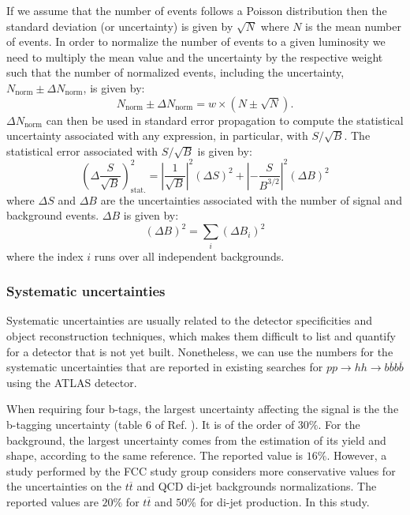 If we assume that the number of events follows a Poisson distribution then the standard deviation (or uncertainty) is given by $\sqrt{N}$ where $N$ is the mean number of events. In order to normalize the number of events to a given luminosity we need to multiply the mean value and the uncertainty by the respective weight such that the number of normalized events, including the uncertainty, $N_{\text{norm}}\pm \Delta N_{\text{norm}}$, is given by:
\begin{equation}
	N_{\text{norm}}\pm \Delta N_{\text{norm}}=w\times \left(N \pm \sqrt{N}\right).
\end{equation}
$\Delta N_{\text{norm}}$ can then be used in standard error propagation to compute the statistical uncertainty associated with any expression, in particular, with $S/\sqrt{B}$. The statistical error associated with $S/\sqrt{B}$ is given by:
\begin{equation}
	\left(\Delta\frac{S}{\sqrt{B}}\right)_{\text{stat.}}^2=\left|\frac{1}{\sqrt{B}}\right|^2 (\Delta S)^2+\left|-\frac{S}{B^{3/2}}\right|^2 (\Delta B)^2
	\label{eq:stat}
\end{equation}
where $\Delta S$ and $\Delta B$ are the uncertainties associated with the number of signal and background events. $\Delta B$ is given by:
\begin{equation}
		(\Delta B)^2 =\sum_i (\Delta B_i)^2
\end{equation}
where the index $i$ runs over all independent backgrounds.

\subsubsection{Systematic uncertainties}

Systematic uncertainties are usually related to the detector specificities and object reconstruction techniques, which makes them difficult to list and quantify for a detector that is not yet built. Nonetheless, we can use the numbers for the systematic uncertainties that are reported in existing searches for $pp\rightarrow hh\rightarrow b\overline{b}b\overline{b}$ using the ATLAS detector.

When requiring four b-tags, the largest uncertainty affecting the signal is the the b-tagging uncertainty (table 6 of Ref. \cite{hh2bbbbATLAS1}). It is of the order of $30\%$.
For the background, the largest uncertainty comes from the estimation of its yield and shape, according to the same reference. The reported value is $16\%$. However, a study performed by the FCC study group \cite{FCCphysClement} considers more conservative values for the uncertainties on the $t\overline{t}$ and  QCD di-jet backgrounds normalizations. The reported values are $20\%$ for $t\overline{t}$ and $50\%$ for di-jet production. In this study.

